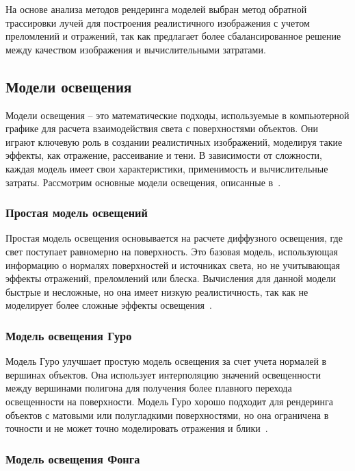 На основе анализа методов рендеринга моделей выбран метод обратной трассировки лучей для построения реалистичного изображения с учетом преломлений и отражений, так как предлагает более сбалансированное решение между качеством изображения и вычислительными затратами.

\subsection{Модели освещения}

Модели освещения -- это математические подходы, используемые в компьютерной графике для расчета взаимодействия света с поверхностями объектов. Они играют ключевую роль в создании реалистичных изображений, моделируя такие эффекты, как отражение, рассеивание и тени. В зависимости от сложности, каждая модель имеет свои характеристики, применимость и вычислительные затраты. Рассмотрим основные модели освещения, описанные в~\cite{Zadorozhny2020}.

\subsubsection{Простая модель освещений}

Простая модель освещения основывается на расчете диффузного освещения, где свет поступает равномерно на поверхность. Это базовая модель, использующая информацию о нормалях поверхностей и источниках света, но не учитывающая эффекты отражений, преломлений или блеска. Вычисления для данной модели быстрые и несложные, но она имеет низкую реалистичность, так как не моделирует более сложные эффекты освещения~\cite[c.~35]{Zadorozhny2020}.

\subsubsection{Модель освещения Гуро}

Модель Гуро улучшает простую модель освещения за счет учета нормалей в вершинах объектов. Она использует интерполяцию значений освещенности между вершинами полигона для получения более плавного перехода освещенности на поверхности. Модель Гуро хорошо подходит для рендеринга объектов с матовыми или полугладкими поверхностями, но она ограничена в точности и не может точно моделировать отражения и блики~\cite[c.~43]{Zadorozhny2020}.

\subsubsection{Модель освещения Фонга}

